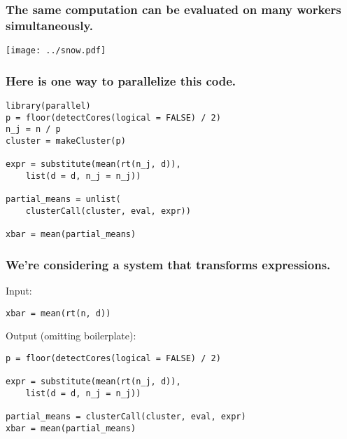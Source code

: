 \documentclass{beamer}
\begin{document}
\begin{frame}

    \frametitle{The same computation can be evaluated on many workers
    simultaneously.}

\centerline{\texttt{[image: ../snow.pdf]}}

\end{frame}
\begin{frame}[fragile]

    \frametitle{Here is one way to parallelize this code.}

\begin{verbatim}
library(parallel)
p = floor(detectCores(logical = FALSE) / 2)
n_j = n / p
cluster = makeCluster(p)

expr = substitute(mean(rt(n_j, d)),
	list(d = d, n_j = n_j))

partial_means = unlist(
    clusterCall(cluster, eval, expr))

xbar = mean(partial_means)
\end{verbatim}

\end{frame}
\begin{frame}[fragile]

    \frametitle{We're considering a system that transforms expressions.}

    Input:

\begin{verbatim}
xbar = mean(rt(n, d))
\end{verbatim}

    Output (omitting boilerplate):

\begin{verbatim}
p = floor(detectCores(logical = FALSE) / 2)

expr = substitute(mean(rt(n_j, d)),
    list(d = d, n_j = n_j))

partial_means = clusterCall(cluster, eval, expr)
xbar = mean(partial_means)
\end{verbatim}

\end{frame}
\end{document}
